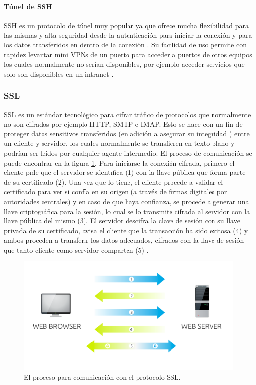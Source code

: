 \paragraph{Túnel de SSH}
SSH es un protocolo de túnel muy popular \citep{Kaspersky-Tunneling} ya que ofrece mucha flexibilidad para las mismas \citep{OpenSSH} y alta seguridad desde la autenticación para iniciar la conexión y para los datos transferidos en dentro de la conexión \citep{OpenBSD-OpenSSH-Features}. Su facilidad de uso permite con rapidez levantar mini VPNs de un puerto para acceder a puertos de otros equipos los cuales normalmente no serían disponibles, por ejemplo acceder servicios que solo son disponibles en un intranet \citep{ENP-Tunneling}.

\subsubsection{SSL}
SSL es un estándar tecnológico para cifrar tráfico \citep{info.SSL.com-SSL} \citep{GlobalSign-SSL} de protocolos que normalmente no son cifrados por ejemplo HTTP, SMTP e IMAP. Esto se hace con un fin de proteger datos sensitivos transferidos (en adición a asegurar su integridad \citep{info.SSL.com-SSL}) entre un cliente y servidor, los cuales normalmente se transfieren en texto plano y podrían ser leídos por cualquier agente intermedio. El proceso de comunicación se puede encontrar en la figura \ref{SSL-Proceso}. Para iniciarse la conexión cifrada, primero el cliente pide que el servidor se identifica (1) con la llave pública que forma parte de su certificado (2). Una vez que lo tiene, el cliente procede a validar el certificado para ver si confía en su origen (a través de firmas digitales por autoridades centrales) y en caso de que haya confianza, se procede a generar una llave criptográfica para la sesión, lo cual se lo transmite cifrada al servidor con la llave pública del mismo (3). El servidor descifra la clave de sesión con su llave privada de su certificado, avisa el cliente que la transacción ha sido exitosa (4) y ambos proceden a transferir los datos adecuados, cifrados con la llave de sesión que tanto cliente como servidor comparten (5) \citep{DigiCert-SSL}.

\begin{figure}
  \begin{center}
      \includegraphics[width=\textwidth]{Figures/ssl-proceso.png}
  \end{center}
  \caption{El proceso para comunicación con el protocolo SSL. \citep{DigiCert-SSL}}
  \label{SSL-Proceso}
\end{figure}

